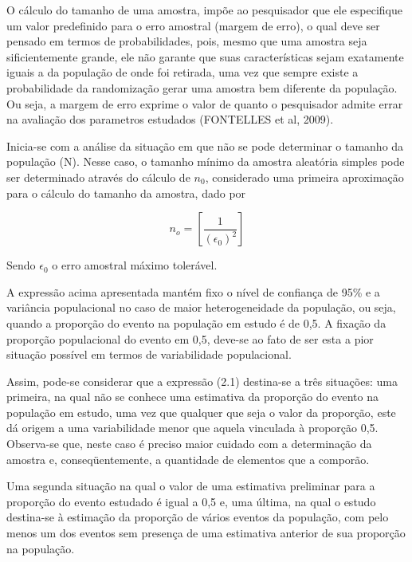 O cálculo do tamanho de uma amostra, impõe ao pesquisador
que ele especifique um valor predefinido para o erro amostral
(margem de erro), o qual deve ser pensado em termos de
probabilidades, pois, mesmo que uma amostra seja sificientemente
grande, ele não garante que suas características sejam exatamente
iguais a da população de onde foi retirada, uma vez que sempre
existe a probabilidade da randomização gerar uma amostra bem
diferente da população. Ou seja, a margem de erro exprime o valor
de quanto o pesquisador admite errar na avaliação dos parametros
estudados (FONTELLES et al, 2009).\vskip0.3cm

Inicia-se com a análise da situação em que não se pode determinar
o tamanho da população (N). Nesse caso, o tamanho mínimo da
amostra aleatória simples pode ser determinado através do cálculo
de $n_{0}$, considerado uma primeira aproximação para o cálculo do
tamanho da amostra, dado por


\begin{equation}\label{nzero}
    n_{o}= \left[  \frac{1}{\left(\epsilon_{0}\right)^2} \right]
\end{equation}

Sendo $\epsilon_{0}$ o erro amostral máximo tolerável.\vskip0.3cm

A expressão acima apresentada mantém fixo o nível de confiança de 95\% e a variância populacional no caso de maior heterogeneidade da população, ou seja, quando a proporção do evento na população em estudo é de 0,5. A fixação da proporção populacional do evento em 0,5, deve-se ao fato de ser esta a pior situação possível em termos de variabilidade populacional. \vskip0.3cm

Assim, pode-se considerar que a expressão (2.1) destina-se a três
situações: uma primeira, na qual não se conhece uma estimativa da
proporção do evento na população em estudo, uma vez que qualquer
que seja o valor da proporção, este dá origem a uma variabilidade
menor que aquela vinculada à proporção 0,5. Observa-se que, neste
caso é preciso maior cuidado com a determinação da amostra e,
conseqüentemente, a quantidade de elementos que a
comporão.\vskip0.3cm

Uma segunda situação na qual o valor de uma estimativa preliminar para a proporção do evento estudado é igual a 0,5 e, uma última, na qual o estudo destina-se à estimação da proporção de vários eventos da população, com pelo menos um dos eventos sem presença de uma estimativa anterior de sua proporção na população.\vskip0.3cm


